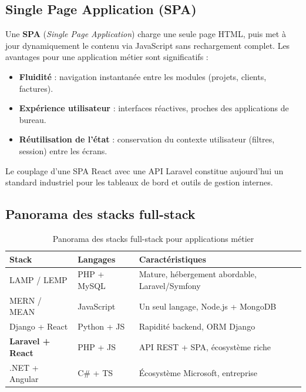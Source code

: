 \subsection{Single Page Application (SPA)}

Une \textbf{SPA} (\textit{Single Page Application}) charge une seule page HTML, puis
met à jour dynamiquement le contenu via JavaScript sans rechargement complet. Les
avantages pour une application métier sont significatifs :

\begin{itemize}
  \item \textbf{Fluidité} : navigation instantanée entre les modules (projets, clients,
  factures).
  \item \textbf{Expérience utilisateur} : interfaces réactives, proches des applications
  de bureau.
  \item \textbf{Réutilisation de l'état} : conservation du contexte utilisateur
  (filtres, session) entre les écrans.
\end{itemize}

Le couplage d'une SPA React avec une API Laravel constitue aujourd'hui un standard
industriel pour les tableaux de bord et outils de gestion internes.

\subsection{Panorama des stacks full-stack}

\begin{table}[H]
\caption{Panorama des stacks full-stack pour applications métier}
\label{tab:stack_panorama}
\centering
\small
\begin{tabular}{|l|l|p{8cm}|}
\hline
\textbf{Stack} & \textbf{Langages} & \textbf{Caractéristiques} \\
\hline
LAMP / LEMP & PHP + MySQL & Mature, hébergement abordable, Laravel/Symfony \\
\hline
MERN / MEAN & JavaScript & Un seul langage, Node.js + MongoDB \\
\hline
Django + React & Python + JS & Rapidité backend, ORM Django \\
\hline
\textbf{Laravel + React} & PHP + JS & API REST + SPA, écosystème riche \\
\hline
.NET + Angular & C\# + TS & Écosystème Microsoft, entreprise \\
\hline
\end{tabular}
\end{table}

